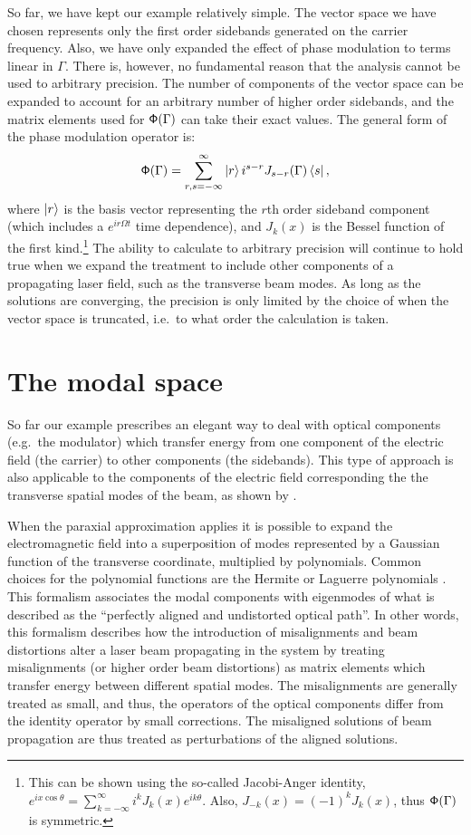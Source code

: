 So far, we have kept our example relatively simple. %
The vector space we have chosen represents only the first order sidebands generated on the carrier frequency. %
Also, we have only expanded the effect of phase modulation to terms linear in $\Gamma$. %
There is, however, no fundamental reason that the analysis cannot be used to arbitrary precision. %
The number of components of the vector space can be expanded to account for an arbitrary number of higher order sidebands, and the matrix elements used for $\mathsf{\Phi}(\Gamma)$ can take their exact values. %
The general form of the phase modulation operator is:
\begin{equation}
\mathsf{\Phi}(\Gamma) = \sum_{r,s=-\infty}^\infty\left| r \right> i^{s-r} J_{s-r}(\Gamma) \left< s \right|,
\end{equation}
where $\left| r \right>$ is the basis vector representing the $r$th order sideband component (which includes a $e^{ir\Omega t}$ time dependence), and $J_k(x)$ is the Bessel function of the first kind.\footnote{This can be shown using the so-called Jacobi-Anger identity, $e^{ix\cos\theta}=\sum_{k=-\infty}^\infty i^kJ_k(x)e^{ik\theta}$. %
Also, $J_{-k}(x)=(-1)^kJ_k(x)$, thus $\mathsf{\Phi}(\Gamma)$ is symmetric.} The ability to calculate to arbitrary precision will continue to hold true when we expand the treatment to include other components of a propagating laser field, such as the transverse beam modes. %
As long as the solutions are converging, the precision is only limited by the choice of when the vector space is truncated, i.e.\ to what order the calculation is taken.

\section{The modal space}
So far our example prescribes an elegant way to deal with optical components (e.g.\ the modulator) which transfer energy from one component of the electric field (the carrier) to other components (the sidebands). %
This type of approach is also applicable to the components of the electric field corresponding the the transverse spatial modes of the beam, as shown by \citet{Hefetz:97}.

When the paraxial approximation applies it is possible to expand the electromagnetic field into a superposition of modes represented by a Gaussian function of the transverse coordinate, multiplied by polynomials. %
Common choices for the polynomial functions are the Hermite or Laguerre polynomials \cite[chap.16]{Siegman}. %
This formalism associates the modal components with eigenmodes of what is described as the ``perfectly aligned and undistorted optical path''. %
In other words, this formalism describes how the introduction of misalignments and beam distortions alter a laser beam propagating in the system by treating misalignments (or higher order beam distortions) as matrix elements which transfer energy between different spatial modes. %
The misalignments are generally treated as small, and thus, the operators of the optical components differ from the identity operator by small corrections. %
The misaligned solutions of beam propagation are thus treated as perturbations of the aligned solutions. %


